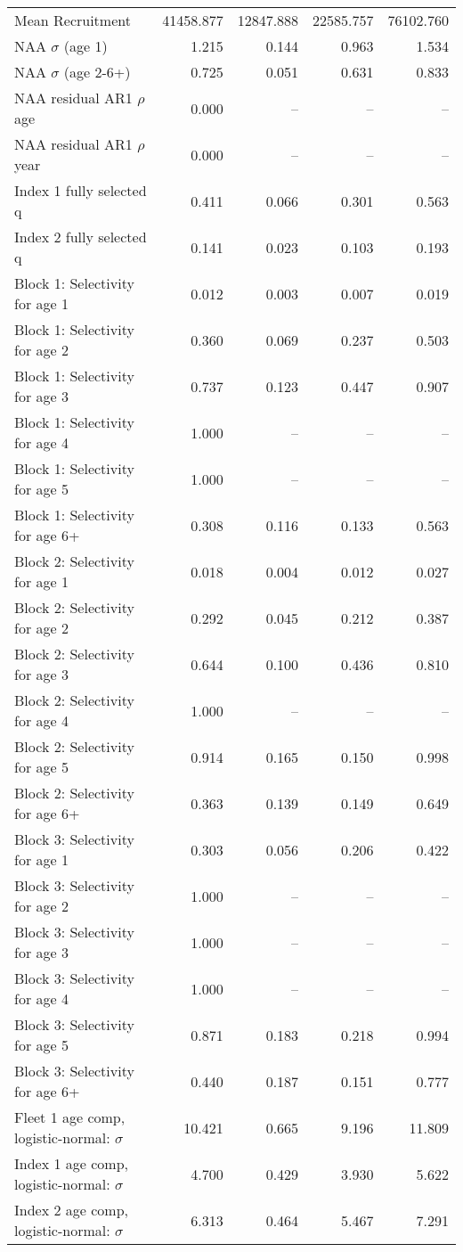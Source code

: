\documentclass[
]{article}
\begin{document}
\begin{landscape}
\begin{longtable}[t]{lrrrr}
\endfoot
\bottomrule
\endlastfoot
Mean Recruitment & 41458.877 & 12847.888 & 22585.757 & 76102.760\\
NAA $\sigma$ (age 1) & 1.215 & 0.144 & 0.963 & 1.534\\
NAA $\sigma$ (age 2-6+) & 0.725 & 0.051 & 0.631 & 0.833\\
NAA residual AR1 $\rho$ age & 0.000 & -- & -- & --\\
NAA residual AR1 $\rho$ year & 0.000 & -- & -- & --\\
\addlinespace
Index 1 fully selected q & 0.411 & 0.066 & 0.301 & 0.563\\
Index 2 fully selected q & 0.141 & 0.023 & 0.103 & 0.193\\
Block 1: Selectivity for age 1 & 0.012 & 0.003 & 0.007 & 0.019\\
Block 1: Selectivity for age 2 & 0.360 & 0.069 & 0.237 & 0.503\\
Block 1: Selectivity for age 3 & 0.737 & 0.123 & 0.447 & 0.907\\
\addlinespace
Block 1: Selectivity for age 4 & 1.000 & -- & -- & --\\
Block 1: Selectivity for age 5 & 1.000 & -- & -- & --\\
Block 1: Selectivity for age 6+ & 0.308 & 0.116 & 0.133 & 0.563\\
Block 2: Selectivity for age 1 & 0.018 & 0.004 & 0.012 & 0.027\\
Block 2: Selectivity for age 2 & 0.292 & 0.045 & 0.212 & 0.387\\
\addlinespace
Block 2: Selectivity for age 3 & 0.644 & 0.100 & 0.436 & 0.810\\
Block 2: Selectivity for age 4 & 1.000 & -- & -- & --\\
Block 2: Selectivity for age 5 & 0.914 & 0.165 & 0.150 & 0.998\\
Block 2: Selectivity for age 6+ & 0.363 & 0.139 & 0.149 & 0.649\\
Block 3: Selectivity for age 1 & 0.303 & 0.056 & 0.206 & 0.422\\
\addlinespace
Block 3: Selectivity for age 2 & 1.000 & -- & -- & --\\
Block 3: Selectivity for age 3 & 1.000 & -- & -- & --\\
Block 3: Selectivity for age 4 & 1.000 & -- & -- & --\\
Block 3: Selectivity for age 5 & 0.871 & 0.183 & 0.218 & 0.994\\
Block 3: Selectivity for age 6+ & 0.440 & 0.187 & 0.151 & 0.777\\
\addlinespace
Fleet 1 age comp, logistic-normal: $\sigma$ & 10.421 & 0.665 & 9.196 & 11.809\\
Index 1 age comp, logistic-normal: $\sigma$ & 4.700 & 0.429 & 3.930 & 5.622\\
Index 2 age comp, logistic-normal: $\sigma$ & 6.313 & 0.464 & 5.467 & 7.291\\*
\end{longtable}
\end{landscape}
\end{document}
